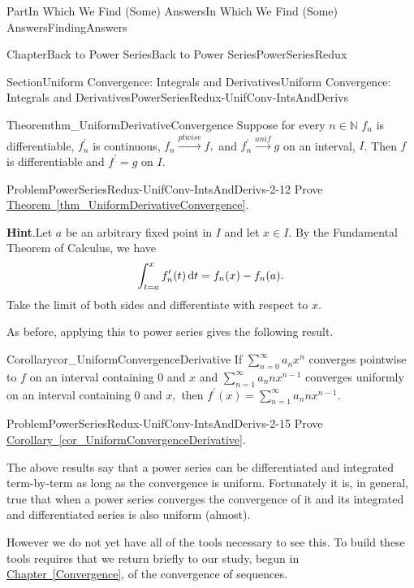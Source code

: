 \documentclass[oneside,10pt,]{book}
\newcommand{\blocktitlefont}{\relax}
\newcommand{\xreffont}{\relax}
\numberwithin{equation}{part}
\newcommand{\dx}[1]{\,{\rm d}#1}
\newcommand{\unif}{\stackrel{unif}{\longrightarrow}}
\newcommand{\ptwise}{\stackrel{ptwise}{\longrightarrow}}
\newcommand{\NN}{\mathbb {N}}
\begin{document}
\begin{partptx}{Part}{In Which We Find (Some) Answers}{}{In Which We Find (Some) Answers}{}{}{FindingAnswers}
\begin{chapterptx}{Chapter}{Back to Power Series}{}{Back to Power Series}{}{}{PowerSeriesRedux}
\begin{sectionptx}{Section}{Uniform Convergence: Integrals and Derivatives}{}{Uniform Convergence: Integrals and Derivatives}{}{}{PowerSeriesRedux-UnifConv-IntsAndDerivs}
\begin{introduction}{}
\begin{theorem}{Theorem}{}{}{thm_UniformDerivativeConvergence}%
%
%
Suppose for every \(n\in\NN\) \(f_n\) is differentiable, \(f_n^\prime\) is continuous, \(f_n\ptwise f,\) and \(f_n^\prime\unif g\) on an interval, \(I\).  Then \(f\) is differentiable and \(f^\prime = g\) on \(I\).%
\end{theorem}
\begin{problem}{Problem}{}{PowerSeriesRedux-UnifConv-IntsAndDerivs-2-12}%
Prove \hyperref[thm_UniformDerivativeConvergence]{Theorem~{\xreffont\ref{thm_UniformDerivativeConvergence}}}.%
\par\smallskip%
\noindent\textbf{\blocktitlefont Hint}.\hypertarget{PowerSeriesRedux-UnifConv-IntsAndDerivs-2-12-4}{}\quad{}Let \(a\) be an arbitrary fixed point in \(I\) and let \(x\in I\).  By the Fundamental Theorem of Calculus, we have%
\begin{equation*}
\int_{t=a}^x f^\prime_n(t)\dx{t}=f_n(x)-f_n(a) \text{.}
\end{equation*}
Take the limit of both sides and differentiate with respect to \(x\).%
\end{problem}
As before, applying this to power series gives the following result.%
\begin{corollary}{Corollary}{}{}{cor_UniformConvergenceDerivative}%
If \(\sum_{n=0}^\infty a_nx^n\) converges pointwise to \(f\) on an interval containing \(0\) and \(x\) and \(\sum_{n=1}^\infty a_nnx^{n-1}\) converges uniformly on an interval containing \(0\) and \(x,\) then \(f^\prime(x)=\sum_{n=1}^\infty a_nnx^{n-1}\).%
\end{corollary}
\begin{problem}{Problem}{}{PowerSeriesRedux-UnifConv-IntsAndDerivs-2-15}%
 Prove \hyperref[cor_UniformConvergenceDerivative]{Corollary~{\xreffont\ref{cor_UniformConvergenceDerivative}}}.%
\end{problem}
The above results say that a power series can be differentiated and integrated term-by-term as long as the convergence is uniform.  Fortunately it is, in general, true that when a power series converges the convergence of it and its integrated and differentiated series is also uniform (almost).%
\par
However we do not yet have all of the tools necessary to see this.  To build these tools requires that we return briefly to our study, begun in \hyperref[Convergence]{Chapter~{\xreffont\ref{Convergence}}}, of the convergence of sequences.%

\end{introduction}
\end{sectionptx}
\end{chapterptx}
\end{partptx}
\end{document}
